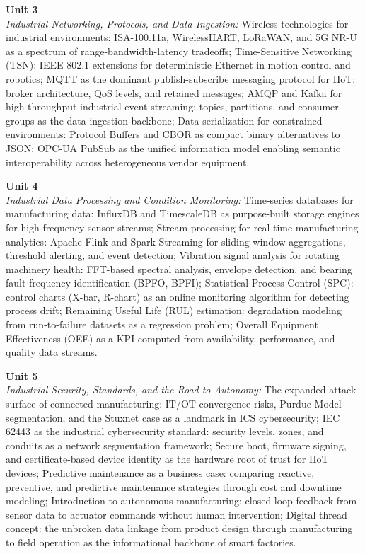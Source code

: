 \vspace{0.3cm}

\noindent\textbf{Unit 3} \\
\textit{Industrial Networking, Protocols, and Data Ingestion:} Wireless technologies for industrial environments: ISA-100.11a, WirelessHART, LoRaWAN, and 5G NR-U as a spectrum of range-bandwidth-latency tradeoffs; Time-Sensitive Networking (TSN): IEEE 802.1 extensions for deterministic Ethernet in motion control and robotics; MQTT as the dominant publish-subscribe messaging protocol for IIoT: broker architecture, QoS levels, and retained messages; AMQP and Kafka for high-throughput industrial event streaming: topics, partitions, and consumer groups as the data ingestion backbone; Data serialization for constrained environments: Protocol Buffers and CBOR as compact binary alternatives to JSON; OPC-UA PubSub as the unified information model enabling semantic interoperability across heterogeneous vendor equipment.

\vspace{0.3cm}

\noindent\textbf{Unit 4} \\
\textit{Industrial Data Processing and Condition Monitoring:} Time-series databases for manufacturing data: InfluxDB and TimescaleDB as purpose-built storage engines for high-frequency sensor streams; Stream processing for real-time manufacturing analytics: Apache Flink and Spark Streaming for sliding-window aggregations, threshold alerting, and event detection; Vibration signal analysis for rotating machinery health: FFT-based spectral analysis, envelope detection, and bearing fault frequency identification (BPFO, BPFI); Statistical Process Control (SPC): control charts (X-bar, R-chart) as an online monitoring algorithm for detecting process drift; Remaining Useful Life (RUL) estimation: degradation modeling from run-to-failure datasets as a regression problem; Overall Equipment Effectiveness (OEE) as a KPI computed from availability, performance, and quality data streams.

\vspace{0.3cm}

\noindent\textbf{Unit 5} \\
\textit{Industrial Security, Standards, and the Road to Autonomy:} The expanded attack surface of connected manufacturing: IT/OT convergence risks, Purdue Model segmentation, and the Stuxnet case as a landmark in ICS cybersecurity; IEC 62443 as the industrial cybersecurity standard: security levels, zones, and conduits as a network segmentation framework; Secure boot, firmware signing, and certificate-based device identity as the hardware root of trust for IIoT devices; Predictive maintenance as a business case: comparing reactive, preventive, and predictive maintenance strategies through cost and downtime modeling; Introduction to autonomous manufacturing: closed-loop feedback from sensor data to actuator commands without human intervention; Digital thread concept: the unbroken data linkage from product design through manufacturing to field operation as the informational backbone of smart factories.

\newpage
{}
